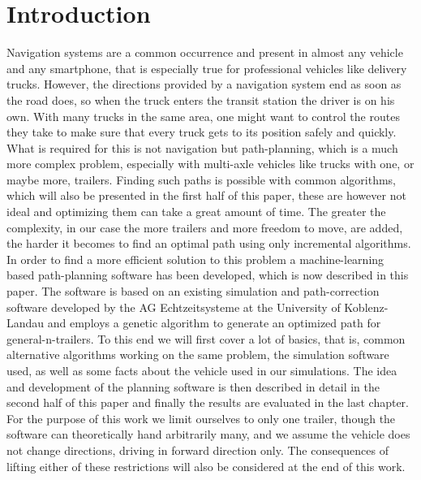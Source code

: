 \chapter{Introduction}
\label{cha:introduction}

Navigation systems are a common occurrence and present in almost any vehicle and any smartphone, that is especially true for professional vehicles like delivery trucks. However, the directions provided by a navigation system end as soon as the road does, so when the truck enters the transit station the driver is on his own. With many trucks in the same area, one might want to control the routes they take to make sure that every truck gets to its position safely and quickly. What is required for this is not navigation but path-planning, which is a much more complex problem, especially with multi-axle vehicles like trucks with one, or maybe more, trailers. Finding such paths is possible with common algorithms, which will also be presented in the first half of this paper, these are however not ideal and optimizing them can take a great amount of time. The greater the complexity, in our case the more trailers and more freedom to move, are added, the harder it becomes to find an optimal path using only incremental algorithms. In order to find a more efficient solution to this problem a machine-learning based path-planning software has been developed, which is now described in this paper. The software is based on an existing simulation and path-correction software developed by the AG Echtzeitsysteme at the University of Koblenz-Landau and employs a genetic algorithm to generate an optimized path for general-n-trailers.
To this end we will first cover a lot of basics, that is, common alternative algorithms working on the same problem, the simulation software used, as well as some facts about the vehicle used in our simulations. The idea and development of the planning software is then described in detail in the second half of this paper and finally the results are evaluated in the last chapter. For the purpose of this work we limit ourselves to only one trailer, though the software can theoretically hand arbitrarily many, and we assume the vehicle does not change directions, driving in forward direction only. The consequences of lifting either of these restrictions will also be considered at the end of this work.
